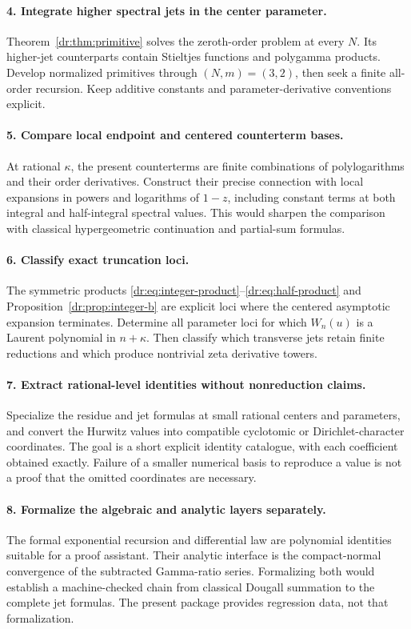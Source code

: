 \documentclass[11pt,letterpaper]{article}
\numberwithin{equation}{section}
\theoremstyle{definition}
\theoremstyle{remark}
\begin{document}
\paragraph{4. Integrate higher spectral jets in the center parameter.}
Theorem~\ref{dr:thm:primitive} solves the zeroth-order problem at every
$N$. Its higher-jet counterparts contain Stieltjes functions and
polygamma products. Develop normalized primitives through $(N,m)=(3,2)$,
then seek a finite all-order recursion. Keep additive constants and
parameter-derivative conventions explicit.

\paragraph{5. Compare local endpoint and centered counterterm bases.}
At rational $\kappa$, the present counterterms are finite combinations of
polylogarithms and their order derivatives. Construct their precise
connection with local expansions in powers and logarithms of $1-z$,
including constant terms at both integral and half-integral spectral
values. This would sharpen the comparison with classical hypergeometric
continuation and partial-sum formulas.

\paragraph{6. Classify exact truncation loci.}
The symmetric products \eqref{dr:eq:integer-product}--\eqref{dr:eq:half-product}
and Proposition~\ref{dr:prop:integer-b} are explicit loci where the centered
asymptotic expansion terminates. Determine all parameter loci for which
$W_n(u)$ is a Laurent polynomial in $n+\kappa$. Then classify which
transverse jets retain finite reductions and which produce nontrivial
zeta derivative towers.

\paragraph{7. Extract rational-level identities without nonreduction claims.}
Specialize the residue and jet formulas at small rational centers and
parameters, and convert the Hurwitz values into compatible cyclotomic or
Dirichlet-character coordinates. The goal is a short explicit identity
catalogue, with each coefficient obtained exactly. Failure of a smaller
numerical basis to reproduce a value is not a proof that the omitted
coordinates are necessary.

\paragraph{8. Formalize the algebraic and analytic layers separately.}
The formal exponential recursion and differential law are polynomial
identities suitable for a proof assistant. Their analytic interface is the
compact-normal convergence of the subtracted Gamma-ratio series.
Formalizing both would establish a machine-checked chain from classical
Dougall summation to the complete jet formulas. The present package
provides regression data, not that formalization.
\end{document}
